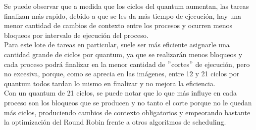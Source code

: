 Se puede observar que a medida que los ciclos del quantum aumentan, las tareas finalizan más rapido, debido a que se les da más tiempo de ejecución, hay una menor cantidad de cambios de contexto entre los procesos y ocurren menos bloqueos por intervalo de ejecución del proceso.
\\
Para este lote de tareas en particular, suele ser más eficiente asignarle una cantidad grande de ciclos por quantum,  ya que se realizarán menos bloqueos y cada proceso podrá finalizar en la menor cantidad de $"$cortes$"$ de ejecución, pero no excesiva, porque, como se aprecia en las imágenes, entre 12 y 21  ciclos por quantum todos tardan lo mismo en finalizar y no mejora la eficiencia.
\\
Con un quantum de 21 ciclos, se puede notar que lo que más influye en cada proceso son los bloqueos que se producen y no tanto el corte porque no le quedan más ciclos, produciendo cambios de contexto obligatorios y empeorando bastante la optimización del Round Robin frente a otros algoritmos de scheduling.


